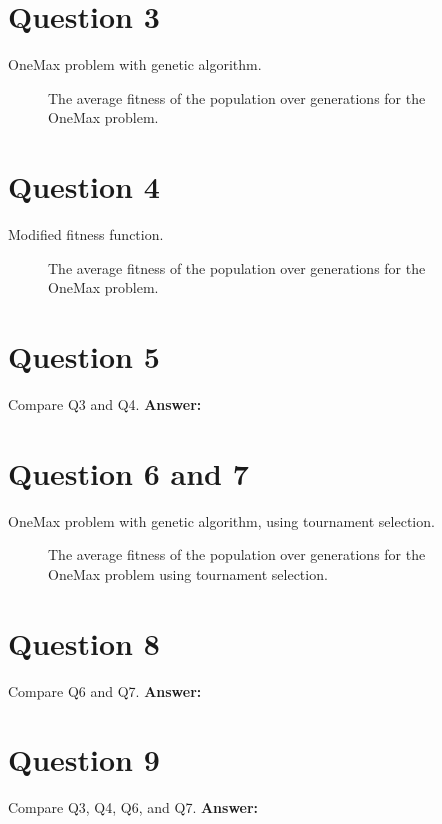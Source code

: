\documentclass[12pt,letterpaper]{article}
\newcommand{\xAns}{\vskip 2mm\textbf{Answer:} }
\begin{document}
\section{Question 3}
OneMax problem with genetic algorithm.
\begin{figure}
    \centering
    \caption{The average fitness of the population over generations for the OneMax problem.}
    \label{fig:3a}
\end{figure}

\section{Question 4}
Modified fitness function.
\begin{figure}
    \centering
    \caption{The average fitness of the population over generations for the OneMax problem.}
    \label{fig:4a}
\end{figure}

\section{Question 5}
Compare Q3 and Q4. \xAns

\section{Question 6 and 7}
OneMax problem with genetic algorithm, using tournament selection.
\begin{figure}
    \centering
    \caption{The average fitness of the population over generations for the OneMax problem using tournament selection.}
    \label{fig:6a}
\end{figure}

\section{Question 8}
Compare Q6 and Q7. \xAns

\section{Question 9}
Compare Q3, Q4, Q6, and Q7. \xAns
\end{document}
